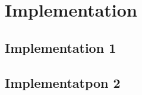 \chapter{Implementation}
\label{chp:implementation} 

\section{Implementation 1}

\section{Implementatpon 2}